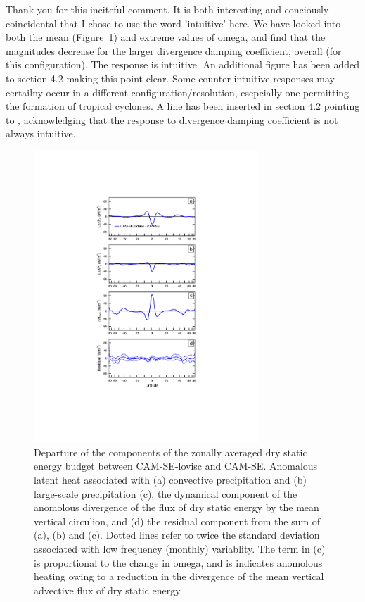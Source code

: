 \documentclass[11pt]{article}
\begin{document}
\begin{itemize}
Thank you for this inciteful comment. It is both interesting and conciously coincidental that I chose to use the word 'intuitive' here. We have looked into both the mean (Figure~\ref{fig:denergy}) and extreme values of omega, and find that the magnitudes decrease for the larger divergence damping coefficient, overall (for this configuration). The response is intuitive. An additional figure has been added to section 4.2 making this point clear. Some counter-intuitive responses may certailny occur in a different configuration/resolution, esepcially one permitting the formation of tropical cyclones. A line has been inserted in section 4.2 pointing to \cite{ZHL2012JAS}, acknowledging that the response to divergence damping coefficient is not always intuitive.

\begin{figure}[h]
\centering
\includegraphics[width=20pc]{temp_denergy_SE_v_SE-oldvisc.pdf}
\caption{Departure of the components of the zonally averaged dry static energy budget between CAM-SE-lovisc and CAM-SE. Anomalous latent heat associated with (a) convective precipitation and (b) large-scale precipitation (c), the dynamical component of the anomolous divergence of the flux of dry static energy by the mean vertical circulion, and (d) the residual component from the sum of (a), (b) and (c). Dotted lines refer to twice the standard deviation associated with low frequency (monthly) variablity. The term in (c) is proportional to the change in omega, and is indicates anomolous heating owing to a reduction in the divergence of the mean vertical advective flux of dry static energy.}
\label{fig:denergy}
\end{figure}


\end{itemize}
\end{document}
